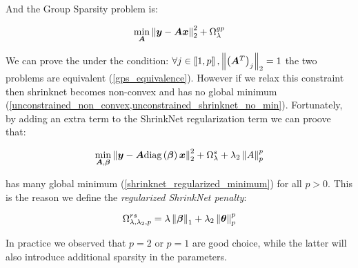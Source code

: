 And the Group Sparsity problem is:

\begin{equation}
  \min_{\bm{A}} \left\lVert\bm{y} - \bm{A}\bm{x}\right\rVert_2^2 + \Omega_\lambda^{gp}
\end{equation}

We can prove the under the condition: $\forall j\in \left\llbracket1, p\right\rrbracket, \left\lVert\left(\bm{A}^T\right)_j\right\rVert_2 = 1$ the two problems are equivalent (\cref{gps_equivalence}). However if we relax this constraint then shrinknet becomes non-convex and has no global minimum (\cref{unconstrained_non_convex,unconstrained_shrinknet_no_min}). Fortunately, by adding an extra term to the ShrinkNet regularization term we can proove that:

\begin{equation}
  \min_{\bm{A}, \bm{\beta}} \left\lVert\bm{y} - \bm{A}\text{diag}\left(\bm{\beta}\right)\bm{x}\right\rVert_2^2 + \Omega_\lambda^s + \lambda_2\left\lVert A\right\rVert_p^p
\end{equation}

has many global minimum (\cref{shrinknet_regularized_minimum}) for all $p>0$. This is the reason we define the \textit{regularized ShrinkNet penalty}:

\begin{equation}
  \Omega_{\lambda, \lambda_2, p}^{rs} = \lambda\left\lVert\bm{\beta}\right\rVert_1 + \lambda_2\left\lVert\bm\theta\right\rVert_p^p
\end{equation}

In practice we observed that $p=2$ or $p=1$ are good choice, while the latter will also introduce additional sparsity in the parameters.